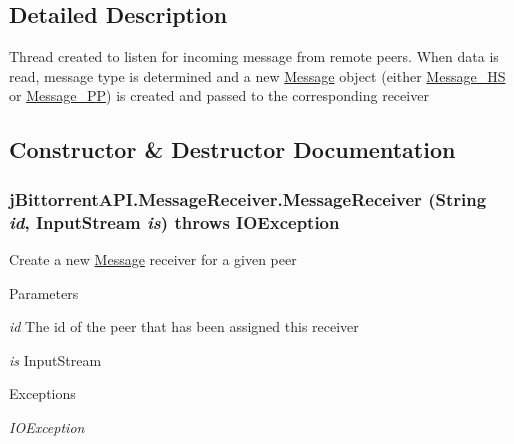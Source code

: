 \subsection{Detailed Description}
Thread created to listen for incoming message from remote peers. When data is read, message type is determined and a new \hyperlink{classj_bittorrent_a_p_i_1_1_message}{Message} object (either \hyperlink{classj_bittorrent_a_p_i_1_1_message___h_s}{Message\_\-HS} or \hyperlink{classj_bittorrent_a_p_i_1_1_message___p_p}{Message\_\-PP}) is created and passed to the corresponding receiver 

\subsection{Constructor \& Destructor Documentation}
\hypertarget{classj_bittorrent_a_p_i_1_1_message_receiver_ad6b379ea7fae866a042bcec60d443692}{
\subsubsection[{MessageReceiver}]{\setlength{\rightskip}{0pt plus 5cm}jBittorrentAPI.MessageReceiver.MessageReceiver (String {\em id}, \/  InputStream {\em is})  throws IOException }}
\label{classj_bittorrent_a_p_i_1_1_message_receiver_ad6b379ea7fae866a042bcec60d443692}
Create a new \hyperlink{classj_bittorrent_a_p_i_1_1_message}{Message} receiver for a given peer 
\begin{DoxyParams}{Parameters}
\item[{\em id}]The id of the peer that has been assigned this receiver \item[{\em is}]InputStream \end{DoxyParams}

\begin{DoxyExceptions}{Exceptions}
\item[{\em IOException}]\end{DoxyExceptions}


